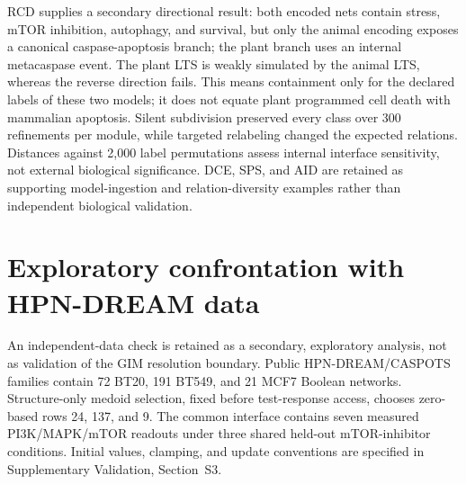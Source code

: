 \documentclass{ws-jbcb}
\numberwithin{equation}{section}
\begin{document}
\begin{table}[t]
\end{table}

RCD supplies a secondary directional result: both encoded nets contain stress,
mTOR inhibition, autophagy, and survival, but only the animal encoding exposes a
canonical caspase-apoptosis branch; the plant branch uses an internal metacaspase
event. The plant LTS is weakly simulated by the animal LTS, whereas the reverse
direction fails. This means containment only for the declared labels of these
two models; it does not equate plant programmed cell death with mammalian
apoptosis. Silent subdivision preserved every class over 300 refinements per
module, while targeted relabeling changed the expected relations. Distances
against 2,000 label permutations assess internal interface sensitivity, not
external biological significance. DCE, SPS, and AID are retained as supporting
model-ingestion and relation-diversity examples rather than independent
biological validation.

\section{Exploratory confrontation with HPN-DREAM data}\label{sec:hpn-method}

An independent-data check is retained as a secondary, exploratory analysis,
not as validation of the GIM resolution boundary. Public HPN-DREAM/CASPOTS
families contain 72 BT20, 191 BT549, and 21 MCF7 Boolean networks.
Structure-only medoid selection, fixed before test-response access, chooses
zero-based rows 24, 137, and 9.\cite{Hill2016,Razzaq2018} The common interface
contains seven measured PI3K/MAPK/mTOR readouts under three shared held-out
mTOR-inhibitor conditions. Initial values, clamping, and update conventions
are specified in Supplementary Validation, Section~S3.
\end{document}
